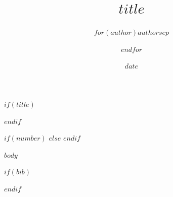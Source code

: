 \documentclass[$if(fontsize)$$fontsize$$else$12pt$endif$]{article}
\title{$title$}
\author{$for(author)$$author$$sep$ \and $endfor$}
\date{$date$}
\makeatletter
\renewcommand{\maketitle}{%
  \begin{center}
    {\LARGE \@title \par}
  \end{center}
  \vspace{2em}
}
\makeatother
\begin{document}
$if(title)$
\maketitle
$endif$

$if(number)$
\pagestyle{plain}
\thispagestyle{plain}
$else$
\pagestyle{empty}
\thispagestyle{empty}
$endif$

$body$

$if(bib)$


$endif$
\end{document}
